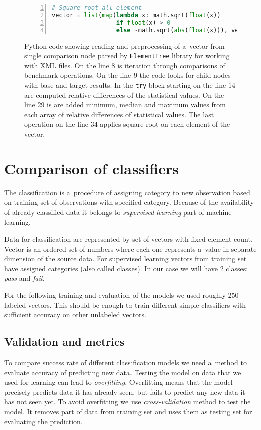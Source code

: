 \begin{figure}
\begin{lstlisting}[language=Python, numbers=left]
# Square root all element
vector = list(map(lambda x: math.sqrt(float(x))
                  if float(x) > 0
                  else -math.sqrt(abs(float(x))), vector)))
  \end{lstlisting}
  \normalsize
  \caption{Python code showing reading and preprocessing of a~vector from single
    comparison node parsed by \texttt{ElementTree} library for working with XML
    files. On the line 8 is iteration through comparisons of benchmark
    operations. On the line 9 the code looks for child nodes with base and
    target results. In the \texttt{try} block starting on the line 14 are
    computed relative differences of the statistical values. On the line 29 is
    are added minimum, median and maximum values from each array of relative
    differences of statistical values. The last operation on the line 34 applies
    square root on each element of the vector.}
  \label{fig:learn_preprocess}
\end{figure}

\section{Comparison of classifiers} \label{sec:classifier_comparison}
The classification is a~procedure of assigning category to new observation based on
training set of observations with specified category. Because of the
availability of already classified data it belongs to \emph{supervised learning}
part of machine learning.

Data for classification are represented by set of vectors with fixed element
count. Vector is an ordered set of numbers where each one represents a~value in
separate dimension of the source data. For supervised learning vectors from
training set have assigned categories (also called classes). In our case we will have
2 classes: \emph{pass} and \emph{fail}.

For the following training and evaluation of the models we used roughly 250
labeled vectors. This should be enough to train different simple classifiers with
sufficient accuracy on other unlabeled vectors.

\subsection{Validation and metrics} \label{subsec:validation}
To compare success rate of different classification models we need a~method to evaluate
accuracy of predicting new data. Testing the model on data that we used for
learning can lead to \emph{overfitting}. Overfitting means that the model
precisely predicts data it has already seen, but fails to predict any new data
it has not seen yet.
To avoid overfitting we use \emph{cross-validation} method to test the model.
It removes part of data from training set and uses them as testing set for
evaluating the prediction.

